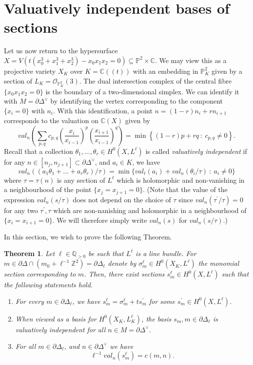 \documentclass{article}
\newcommand{\PP}{\mathbb{P}}
\newcommand{\QQ}{\mathbb{Q}}
\newcommand{\CC}{\mathbb{C}}
\newcommand{\ZZ}{\mathbb{Z}}
\newtheorem{theorem}{Theorem}
\begin{document}
\section{Valuatively independent bases of sections}\label{sec:Bases}
Let us now return to the hypersurface $X = V(t(x_0^3+x_1^3+x_2^3)-x_0x_1x_2=0) \subseteq \PP^2\times\CC$. We may view this as a projective variety $X_K$ over $K= \CC((t))$ with an embedding in $\PP^2_{K}$ given by a section of $L_K=\mathcal O_{\PP^2_K}(3)$. The dual intersection complex of the central fibre $\{x_0x_1x_2=0\}$ is the boundary of a two-dimensional simplex. We can identify it with $M = \partial\Delta^\vee$ by identifying the vertex corresponding to the component $\{x_i=0\}$ with $n_i$. With this identification, a point $n =(1-r)n_i+rn_{i+1}$ corresponds to the valuation on $\CC(X)$ given by
\[val_n\left(\sum_{p,q} c_{p,q} \left(\frac{x_i}{x_{i-1}}\right)^{p}\left(\frac{x_{i+1}}{x_{i-1}}\right)^q\right) = \min \left\{(1-r)p+rq \ : \ c_{p,q}\neq 0\right\}.\]
Recall that a collection $\theta_1,\dots,\theta_r \in H^0(X,L^\ell)$ is called \emph{valuatively independent} if for any $n\in [n_j,n_{j+1}]\subset  \partial\Delta^\vee$, and $a_i\in K$, we have 
\[
val_n((a_1\theta_1+\dots+a_r\theta_r)/\tau) = \min\{val_t(a_i)+val_n(\theta_i/\tau) \ : \ a_i \neq 0 \}
\]
where $\tau=\tau(n)$ is any section of $L^\ell$ which is holomorphic and non-vanishing in a neighbourhood of the point $\{x_j = x_{j+1}=0\}$. (Note that the value of the expression $val_n(s/\tau)$ does not depend on the choice of $\tau$ since $val_n(\tau^\prime/\tau) = 0$ for any two $\tau^\prime,\tau$ which are non-nanishing and holomorphic in a neighbourhood of $\{x_i=x_{i+1}=0\}$. We will therefore simply write $val_n(s)$ for $val_n(s/\tau)$.)

In this section, we wish to prove the following Theorem.
\begin{theorem}
    Let $\ell\in\QQ_{>0}$ be such that $L^\ell$ is a line bundle. For $m\in\partial\Delta\cap(m_0+\ell^{-1}\ZZ^2) = \partial\Delta_\ell$ denote by $\sigma^\ell_m \in H^0(X_K,L^\ell)$ the monomial section corresponding to $m$. Then, there exist sections $s_m^\ell \in H^0(X,L^\ell)$ such that the following statements hold.
    \begin{enumerate}
        \item For every $m\in\partial\Delta_\ell$, we have $s^\ell_m= \sigma^\ell_m + ts_m^\prime$ for some $s_m^\prime \in H^0(X,L^\ell)$.
        \item When viewed as a basis for $H^0(X_K,L^\ell_K)$, the basis $s_m, m\in\partial\Delta_\ell$ is valuatively independent for all $n\in M = \partial\Delta^\vee$.
        \item For all $m\in\partial\Delta_\ell$, and $n\in\partial\Delta^\vee$ we have 
        \[
        \ell^{-1}val_n(s^\ell_m)=c(m,n).
        \]
    \end{enumerate}  
\end{theorem}
\end{document}
